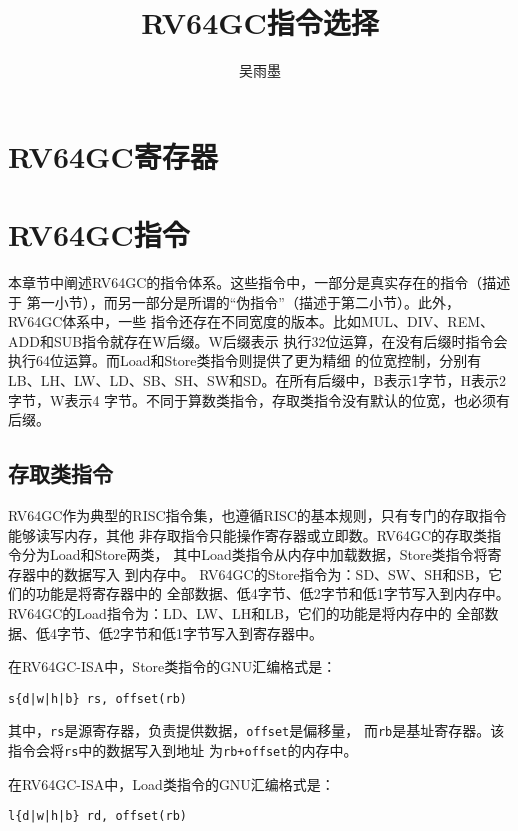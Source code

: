 \documentclass[a4paper, oneside, twocolumn]{ctexbook}
\begin{document}
\author{吴雨墨}
\title{RV64GC指令选择}
\maketitle

\tableofcontents

\chapter{RV64GC寄存器}



\chapter{RV64GC指令}
本章节中阐述RV64GC的指令体系。这些指令中，一部分是真实存在的指令（描述于
第一小节），而另一部分是所谓的“伪指令”（描述于第二小节）。此外，RV64GC体系中，一些
指令还存在不同宽度的版本。比如MUL、DIV、REM、ADD和SUB指令就存在W后缀。W后缀表示
执行32位运算，在没有后缀时指令会执行64位运算。而Load和Store类指令则提供了更为精细
的位宽控制，分别有LB、LH、LW、LD、SB、SH、SW和SD。在所有后缀中，B表示1字节，H表示2字节，W表示4
字节。不同于算数类指令，存取类指令没有默认的位宽，也必须有后缀。

\section{存取类指令}
RV64GC作为典型的RISC指令集，也遵循RISC的基本规则，只有专门的存取指令能够读写内存，其他
非存取指令只能操作寄存器或立即数。RV64GC的存取类指令分为Load和Store两类，
其中Load类指令从内存中加载数据，Store类指令将寄存器中的数据写入
到内存中。
RV64GC的Store指令为：SD、SW、SH和SB，它们的功能是将寄存器中的
全部数据、低4字节、低2字节和低1字节写入到内存中。
RV64GC的Load指令为：LD、LW、LH和LB，它们的功能是将内存中的
全部数据、低4字节、低2字节和低1字节写入到寄存器中。

在RV64GC-ISA中，Store类指令的GNU汇编格式是：
\begin{center}
\verb+s{d|w|h|b} rs, offset(rb)+
\end{center}

其中，\verb|rs|是源寄存器，负责提供数据，\verb|offset|是偏移量，
而\verb|rb|是基址寄存器。该指令会将\verb|rs|中的数据写入到地址
为\verb#rb+offset#的内存中。

在RV64GC-ISA中，Load类指令的GNU汇编格式是：
\begin{center}
\verb+l{d|w|h|b} rd, offset(rb)+
\end{center}
\end{document}
